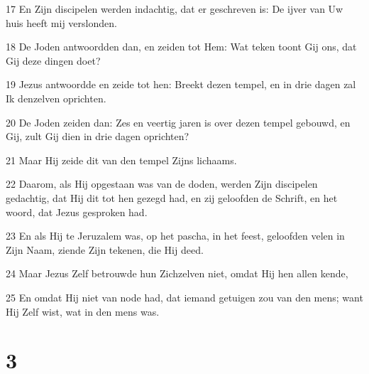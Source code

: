 \par 17 En Zijn discipelen werden indachtig, dat er geschreven is: De ijver van Uw huis heeft mij verslonden.
\par 18 De Joden antwoordden dan, en zeiden tot Hem: Wat teken toont Gij ons, dat Gij deze dingen doet?
\par 19 Jezus antwoordde en zeide tot hen: Breekt dezen tempel, en in drie dagen zal Ik denzelven oprichten.
\par 20 De Joden zeiden dan: Zes en veertig jaren is over dezen tempel gebouwd, en Gij, zult Gij dien in drie dagen oprichten?
\par 21 Maar Hij zeide dit van den tempel Zijns lichaams.
\par 22 Daarom, als Hij opgestaan was van de doden, werden Zijn discipelen gedachtig, dat Hij dit tot hen gezegd had, en zij geloofden de Schrift, en het woord, dat Jezus gesproken had.
\par 23 En als Hij te Jeruzalem was, op het pascha, in het feest, geloofden velen in Zijn Naam, ziende Zijn tekenen, die Hij deed.
\par 24 Maar Jezus Zelf betrouwde hun Zichzelven niet, omdat Hij hen allen kende,
\par 25 En omdat Hij niet van node had, dat iemand getuigen zou van den mens; want Hij Zelf wist, wat in den mens was.

\chapter{3}

